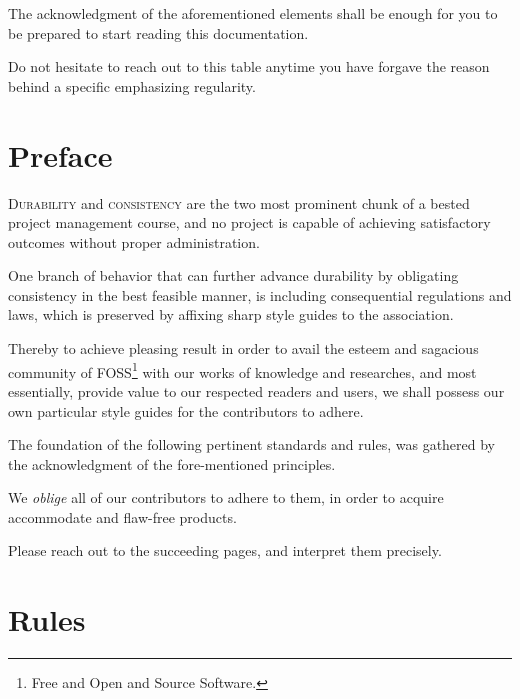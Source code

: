 \documentclass[13pt]{scrarticle}
\newcommand{\header}[1]{ \textsf{#1} \relax{}}
\newcommand{\important}[1]{\textit{#1}}
\newcommand{\name}[1]{{\textsc{#1}}}
\begin{document}
    The acknowledgment of the aforementioned elements shall be enough
    for you to be prepared to start reading this documentation. \newline

    Do not hesitate to reach out to this table anytime you have forgave the reason behind a specific emphasizing regularity. \newline


    \newpage
    \section{\header{Preface}}


    \name{Durability } and \name{consistency } are the two most prominent chunk of a bested project management course,
    and no project is capable of achieving satisfactory outcomes without proper administration. \newline

    One branch of behavior that can further advance durability by obligating consistency in the best feasible manner,
    is including consequential regulations and laws,
    which is preserved by affixing sharp style guides to the association. \newline

    Thereby to achieve pleasing result in order to avail the esteem and sagacious community of \name{FOSS}\footnote{Free and Open and Source Software.} with our works of knowledge and researches,
    and most essentially, provide value to our respected readers and users,
    we shall possess our own particular style guides for the contributors to adhere. \newline

    The foundation of the following pertinent standards and rules, was gathered by the acknowledgment of the fore-mentioned
    principles. \newline

    We \important{oblige} all of our contributors to adhere to them,
    in order to acquire accommodate and flaw-free products. \newline

    Please reach out to the succeeding pages,
    and interpret them precisely.


    \newpage
    \thispagestyle{fancy}

    \section{\header{Rules}}
\end{document}
